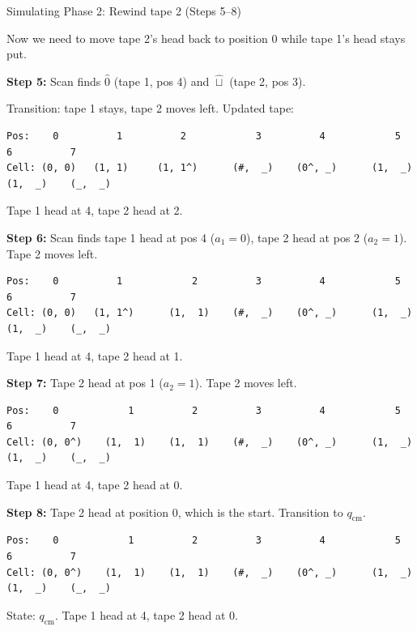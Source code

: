 \documentclass[11pt,a4paper]{article}
\begin{document}
\begin{examplebox}{{Simulating Phase 2: Rewind tape 2 (Steps 5--8)}}

Now we need to move tape 2's head back to position 0 while tape 1's head stays put.

\textbf{Step 5:} Scan finds $\hat{0}$ (tape 1, pos 4) and $\hat{\sqcup}$ (tape 2, pos 3).

Transition: tape 1 stays, tape 2 moves left. Updated tape:
\begin{lstlisting}
Pos:    0          1          2            3          4            5          6          7
Cell: (0, 0)   (1, 1)     (1, 1^)      (#,  _)    (0^, _)      (1,  _)    (1,  _)    (_,  _)
\end{lstlisting}
Tape 1 head at 4, tape 2 head at 2.

\textbf{Step 6:} Scan finds tape 1 head at pos 4 ($a_1 = 0$), tape 2 head at pos 2 ($a_2 = 1$). Tape 2 moves left.
\begin{lstlisting}
Pos:    0          1            2          3          4            5          6          7
Cell: (0, 0)   (1, 1^)      (1,  1)    (#,  _)    (0^, _)      (1,  _)    (1,  _)    (_,  _)
\end{lstlisting}
Tape 1 head at 4, tape 2 head at 1.

\textbf{Step 7:} Tape 2 head at pos 1 ($a_2 = 1$). Tape 2 moves left.
\begin{lstlisting}
Pos:    0            1          2          3          4            5          6          7
Cell: (0, 0^)    (1,  1)    (1,  1)    (#,  _)    (0^, _)      (1,  _)    (1,  _)    (_,  _)
\end{lstlisting}
Tape 1 head at 4, tape 2 head at 0.

\textbf{Step 8:} Tape 2 head at position 0, which is the start. Transition to $q_{\text{cm}}$.
\begin{lstlisting}
Pos:    0            1          2          3          4            5          6          7
Cell: (0, 0^)    (1,  1)    (1,  1)    (#,  _)    (0^, _)      (1,  _)    (1,  _)    (_,  _)
\end{lstlisting}
State: $q_{\text{cm}}$. Tape 1 head at 4, tape 2 head at 0.
\end{examplebox}
\end{document}
